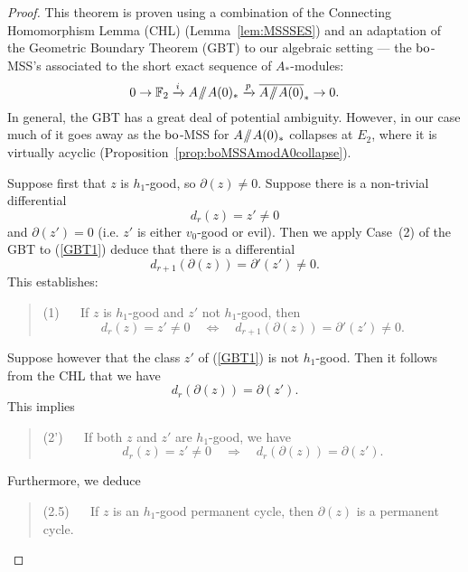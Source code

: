 \begin{proof}
This theorem is proven using a combination of the Connecting Homomorphism Lemma (CHL) (Lemma~\ref{lem:MSSSES}) and an adaptation of the Geometric Boundary Theorem (GBT) \cite[Lem. A.4.1]{goodEHP} to our algebraic setting --- the $\mathrm{bo}$-MSS's associated to the short exact sequence of $A_*$-modules:
$$ 0 \rightarrow \FF_2 \xrightarrow{i} A \mmod A(0)_* \xrightarrow{p} \AA0 \rightarrow 0. $$ 
In general, the GBT has a great deal of potential ambiguity.  However, in our case much of it goes away as the $\mathrm{bo}$-MSS for $A \! \sslash \! A(0)_*$ collapses at $E_2$, where it is virtually acyclic (Proposition~\ref{prop:boMSSAmodA0collapse}).

Suppose first that $z$ is $h_1$-good, so $\partial(z) \ne 0$.  Suppose
there is a non-trivial differential
\begin{equation}\label{GBT1}
d_r(z) = z' \ne 0
\end{equation}
and $\partial(z') = 0$ (i.e. $z'$ is either $v_0$-good or evil).  Then we apply Case~(2) of the GBT to (\ref{GBT1}) deduce that there is a differential
$$ d_{r+1}(\partial(z)) = \partial'(z') \ne 0. $$
This establishes:
\begin{quote}
(1) $\quad$ If $z$ is $h_1$-good and $z'$ not $h_1$-good, then 
$$ d_r (z) = z' \ne 0 \quad \Leftrightarrow \quad d_{r+1}(\partial(z)) = \partial'(z') \ne 0. $$
\end{quote}
Suppose however that the class $z'$ of (\ref{GBT1}) is not $h_1$-good.  Then it follows from the CHL that we have 
$$ d_r(\partial(z)) = \partial(z'). $$
This implies
\begin{quote}
(2') $\quad$ If both $z$ and $z'$ are $h_1$-good, we have
$$ d_r(z) = z' \ne 0  \quad \Rightarrow \quad d_r(\partial(z)) = \partial(z'). $$ 
\end{quote}
Furthermore, we deduce
\begin{quote}
(2.5) $\quad$ If $z$ is an $h_1$-good permanent cycle, then $\partial(z)$ is a permanent cycle.
\end{quote}  


\end{proof}

